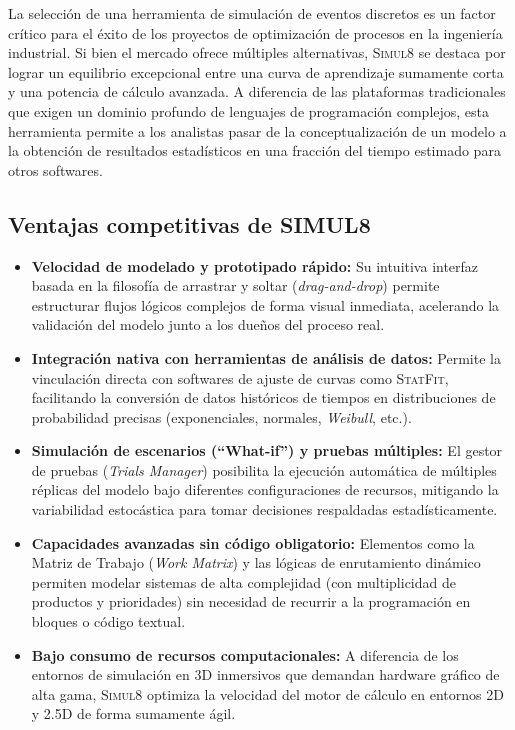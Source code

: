 \documentclass[runningheads]{llncs}
\begin{document}
La selección de una herramienta de simulación de eventos discretos es un factor crítico para el éxito de los proyectos de optimización de procesos en la ingeniería industrial. Si bien el mercado ofrece múltiples alternativas, \textsc{Simul8} se destaca por lograr un equilibrio excepcional entre una curva de aprendizaje sumamente corta y una potencia de cálculo avanzada. A diferencia de las plataformas tradicionales que exigen un dominio profundo de lenguajes de programación complejos, esta herramienta permite a los analistas pasar de la conceptualización de un modelo a la obtención de resultados estadísticos en una fracción del tiempo estimado para otros softwares.

\subsection{Ventajas competitivas de SIMUL8}

\begin{itemize}
    \item \textbf{Velocidad de modelado y prototipado rápido:} Su intuitiva interfaz basada en la filosofía de arrastrar y soltar (\textit{drag-and-drop}) permite estructurar flujos lógicos complejos de forma visual inmediata, acelerando la validación del modelo junto a los dueños del proceso real.
    \item \textbf{Integración nativa con herramientas de análisis de datos:} Permite la vinculación directa con softwares de ajuste de curvas como \textsc{StatFit}, facilitando la conversión de datos históricos de tiempos en distribuciones de probabilidad precisas (exponenciales, normales, \textit{Weibull}, etc.).
    \item \textbf{Simulación de escenarios (``What-if'') y pruebas múltiples:} El gestor de pruebas (\textit{Trials Manager}) posibilita la ejecución automática de múltiples réplicas del modelo bajo diferentes configuraciones de recursos, mitigando la variabilidad estocástica para tomar decisiones respaldadas estadísticamente.
    \item \textbf{Capacidades avanzadas sin código obligatorio:} Elementos como la Matriz de Trabajo (\textit{Work Matrix}) y las lógicas de enrutamiento dinámico permiten modelar sistemas de alta complejidad (con multiplicidad de productos y prioridades) sin necesidad de recurrir a la programación en bloques o código textual.
    \item \textbf{Bajo consumo de recursos computacionales:} A diferencia de los entornos de simulación en 3D inmersivos que demandan hardware gráfico de alta gama, \textsc{Simul8} optimiza la velocidad del motor de cálculo en entornos 2D y 2.5D de forma sumamente ágil.
\end{itemize}
\end{document}
